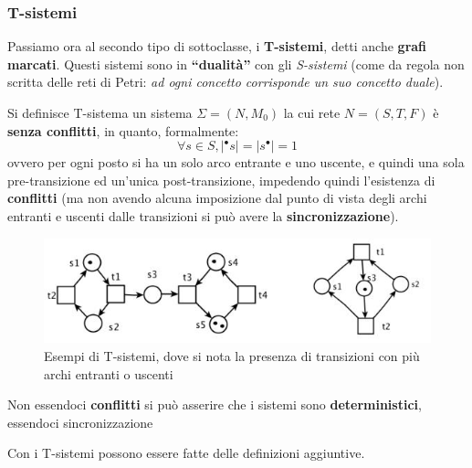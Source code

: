 \documentclass[a4paper,12pt, oneside]{book}
\begin{document}
\subsubsection{T-sistemi}
Passiamo ora al secondo tipo di sottoclasse, i \textbf{T-sistemi}, detti anche
\textbf{grafi marcati}. Questi sistemi sono in \textbf{``dualità''} con gli
\textit{S-sistemi} (come da regola non scritta delle reti di Petri: \textit{ad
  ogni concetto corrisponde un suo concetto duale}).
\begin{definizione}
  Si definisce T-sistema un sistema $\Sigma = (N,M_0)$ la cui rete $N=(S,T,F)$ è
  \textbf{senza conflitti}, in quanto, formalmente:
  \[\forall s\in S, |^\bullet s|=|s^\bullet|=1\]
  ovvero per ogni posto si ha un solo arco entrante e uno uscente, e quindi una
  sola pre-transizione ed un'unica post-transizione, impedendo quindi
  l'esistenza di \textbf{conflitti} (ma non avendo alcuna imposizione dal punto
  di vista degli archi entranti e uscenti dalle transizioni si può avere la
  \textbf{sincronizzazione}).\\
  \begin{figure}[H]
    \centering
    \includegraphics[scale = 0.5]{img/tsi.jpg}
    \caption{Esempi di T-sistemi, dove si nota la presenza di transizioni con
      più archi entranti o uscenti}  
  \end{figure}
  Non essendoci \textbf{conflitti} si può asserire che i sistemi sono
  \textbf{deterministici}, essendoci sincronizzazione
\end{definizione}
Con i T-sistemi possono essere fatte delle definizioni aggiuntive.
\end{document}
